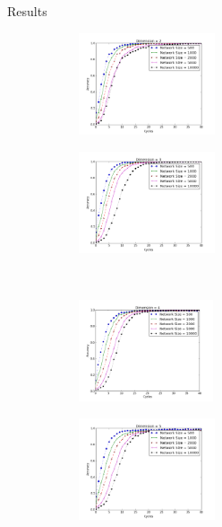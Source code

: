 \documentclass[8pt]{beamer}
\begin{document}
\begin{frame}{Results}
 

\begin{figure}
 	\label{fig:conv}
 		\begin{subfigure}[b]{.45\linewidth}
 			\centering
 			\includegraphics[height=3cm]{conv_d2}
 			\label{conv2}
 		\end{subfigure} 
 		\begin{subfigure}[b]{.45\linewidth}
 			\centering
 			\includegraphics[height=3cm]{conv_d3}
 			\label{conv3}
 		\end{subfigure}\\
 		\begin{subfigure}[b]{.45\linewidth}
 		\centering
 			\includegraphics[height=3cm]{conv_d4}
 			\label{conv4}
 		\end{subfigure}
 		\begin{subfigure}[b]{.45\linewidth}
 			\centering
 			\includegraphics[height=3cm]{conv_d5}
 			\label{conv5}
 		\end{subfigure}
 		

\end{figure}
\end{frame}
\end{document}
